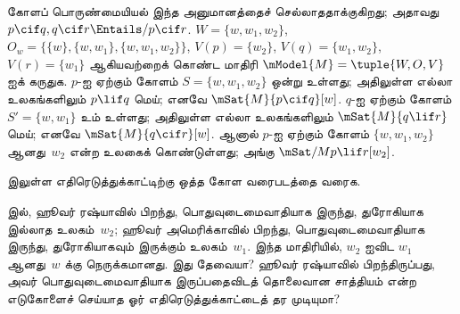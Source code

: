 \documentclass[../../../include/open-logic-section]{subfiles}
\begin{document}
\begin{ex}
  கோளப் பொருண்மையியல் இந்த அனுமானத்தைச் செல்லாததாக்குகிறது; அதாவது $p
  \cif q, q \cif r \Entails/ p \cif r$. $W = \{w, w_1, w_2\}$,
  $O_w = \{\{w\}, \{w, w_1\}, \{w, w_1, w_2\}\}$, $V(p) = \{w_2\}$,
  $V(q) = \{w_1, w_2\}$, $V(r) = \{w_1\}$ ஆகியவற்றைக் கொண்ட மாதிரி
  $\mModel{M} = \tuple{W, O, V}$ ஐக் கருதுக. $p$-ஐ ஏற்கும் கோளம்
  $S = \{w, w_1, w_2\}$ ஒன்று உள்ளது; அதிலுள்ள எல்லா உலகங்களிலும்
  $p \lif q$ மெய்; எனவே $\mSat{M}{p \cif q}[w]$. $q$-ஐ ஏற்கும்
  கோளம் $S' = \{w, w_1\}$ உம் உள்ளது; அதிலுள்ள எல்லா உலகங்களிலும்
  $\mSat{M}{q \lif r}$ மெய்; எனவே $\mSat{M}{q \cif r}[w]$.
  ஆனால் $p$-ஐ ஏற்கும் கோளம் $\{w, w_1, w_2\}$ ஆனது~$w_2$ என்ற உலகைக்
  கொண்டுள்ளது; அங்கு $\mSat/{M}{p \lif r}[w_2]$.
\end{ex}

\begin{prob}
 இலுள்ள எதிரெடுத்துக்காட்டிற்கு
ஒத்த கோள வரைபடத்தை வரைக.
\end{prob}

\begin{prob}
   இல், ஹூவர் ரஷ்யாவில்
  பிறந்து, பொதுவுடைமைவாதியாக இருந்து, துரோகியாக இல்லாத உலகம்~$w_2$;
  ஹூவர் அமெரிக்காவில் பிறந்து, பொதுவுடைமைவாதியாக இருந்து, துரோகியாகவும்
  இருக்கும் உலகம்~$w_1$. இந்த மாதிரியில், $w_2$ ஐவிட $w_1$ ஆனது~$w$
  க்கு நெருக்கமானது. இது தேவையா? ஹூவர் ரஷ்யாவில் பிறந்திருப்பது, அவர்
  பொதுவுடைமைவாதியாக இருப்பதைவிடத் தொலைவான சாத்தியம் என்ற எடுகோளைச்
  செய்யாத ஓர் எதிரெடுத்துக்காட்டைத் தர முடியுமா?
\end{prob}
\end{document}
